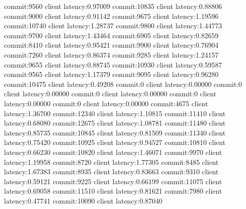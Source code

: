 commit:9560 client latency:0.97009
commit:10835 client latency:0.88806
commit:9000 client latency:0.91142
commit:9675 client latency:1.19596
commit:10740 client latency:1.28737
commit:9800 client latency:1.44773
commit:9700 client latency:1.43464
commit:6905 client latency:0.82659
commit:8410 client latency:0.95421
commit:9900 client latency:0.76904
commit:7260 client latency:0.86374
commit:9285 client latency:1.24157
commit:9655 client latency:0.88745
commit:10930 client latency:0.59587
commit:9565 client latency:1.17379
commit:9095 client latency:0.96280
commit:10475 client latency:0.49208
commit:0 client latency:0.00000
commit:0 client latency:0.00000
commit:0 client latency:0.00000
commit:0 client latency:0.00000
commit:0 client latency:0.00000
commit:4675 client latency:1.36700
commit:12340 client latency:1.10815
commit:11410 client latency:0.68080
commit:12675 client latency:1.08781
commit:11480 client latency:0.85735
commit:10845 client latency:0.81509
commit:11340 client latency:0.75420
commit:10925 client latency:0.94527
commit:10810 client latency:0.66230
commit:10820 client latency:1.46071
commit:9970 client latency:1.19958
commit:8720 client latency:1.77305
commit:8485 client latency:1.67383
commit:8935 client latency:0.83663
commit:9310 client latency:0.59121
commit:9225 client latency:0.66199
commit:11075 client latency:0.69058
commit:11510 client latency:0.81621
commit:7980 client latency:0.47741
commit:10090 client latency:0.87040
